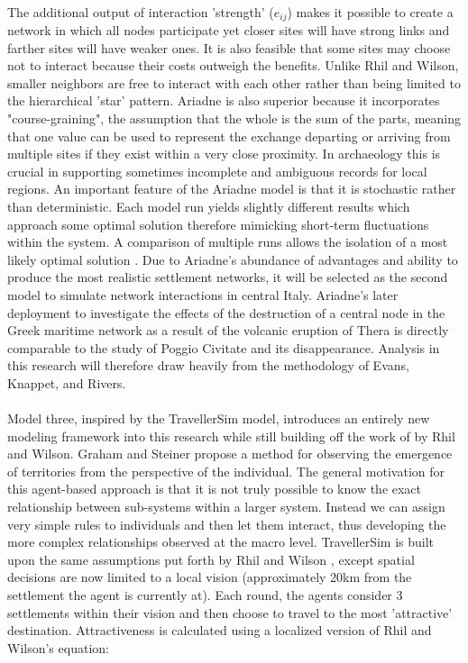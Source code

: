 \documentclass[12pt,a4paper]{thesis}
\begin{document}
\paragraph{}
The additional output of interaction 'strength' ($e_{ij}$) makes it possible to create a network in which all nodes participate yet closer sites will have strong links and farther sites will have weaker ones. It is also feasible that some sites may choose not to interact because their costs outweigh the benefits. Unlike Rhil and Wilson, smaller neighbors are free to interact with each other rather than being limited to the hierarchical 'star' pattern. Ariadne is also superior because it incorporates "course-graining", the assumption that the whole is the sum of the parts, meaning that one value can be used to represent the exchange departing or arriving from multiple sites if they exist within a very close proximity. In archaeology this is crucial in supporting sometimes incomplete and ambiguous records for local regions. An important feature of the Ariadne model is that it is stochastic rather than deterministic. Each model run yields slightly different results which approach some optimal solution therefore mimicking short-term fluctuations within the system. A comparison of multiple runs allows the isolation of a most likely optimal solution \citep[12]{ERK12}. Due to Ariadne's abundance of advantages and ability to produce the most realistic settlement networks, it will be selected as the second model to simulate network interactions in central Italy. Ariadne's later deployment to investigate the effects of the destruction of a central node in the Greek maritime network as a result of the volcanic eruption of Thera \citep{KnaRivEva11} is directly comparable to the study of Poggio Civitate and its disappearance. Analysis in this research will therefore draw heavily from the methodology of Evans, Knappet, and Rivers.
	
\paragraph{}
Model three, inspired by the TravellerSim model, introduces an entirely new modeling framework into this research while still building off the work of by Rhil and Wilson. Graham and Steiner \citeyearpar{GraSte08} propose a method for observing the emergence of territories from the perspective of the individual. The general motivation for this agent-based approach is that it is not truly possible to know the exact relationship between sub-systems within a larger system. Instead we can assign very simple rules to individuals and then let them interact, thus developing the more complex relationships observed at the macro level. TravellerSim is built upon the same assumptions put forth by Rhil and Wilson \citep[64, 71]{RihWil91}, except spatial decisions are now limited to a local vision (approximately 20km from the settlement the agent is currently at). Each round, the agents consider 3 settlements within their vision and then choose to travel to the most 'attractive' destination. Attractiveness is calculated using a localized version of Rhil and Wilson's equation:
\end{document}
